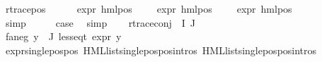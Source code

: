 \begin{isabellebody}
\ {\isacharparenleft}{\kern0pt}r{\isacharunderscore}{\kern0pt}trace{\isacharunderscore}{\kern0pt}pos\ {\isasymphi}\ {\isasymalpha}{\isacharparenright}{\kern0pt}\isanewline
\ \ \isamarkupfalse%
\ {\isachardoublequoteopen}expr{\isacharunderscore}{\kern0pt}{}\ {\isacharparenleft}{\kern0pt}hml{\isacharunderscore}{\kern0pt}pos\ {\isasymalpha}\ {\isasymphi}{\isacharparenright}{\kern0pt}\ {\isasymle}\ {}{\isachardoublequoteclose}\ {\isachardoublequoteopen}expr{\isacharunderscore}{\kern0pt}{}\ {\isacharparenleft}{\kern0pt}hml{\isacharunderscore}{\kern0pt}pos\ {\isasymalpha}\ {\isasymphi}{\isacharparenright}{\kern0pt}\ {\isasymle}\ {}{\isachardoublequoteclose}\ {\isachardoublequoteopen}expr{\isacharunderscore}{\kern0pt}{}\ {\isacharparenleft}{\kern0pt}hml{\isacharunderscore}{\kern0pt}pos\ {\isasymalpha}\ {\isasymphi}{\isacharparenright}{\kern0pt}\ {\isasymle}\ {}{\isachardoublequoteclose}\isanewline
\ \ \ \ \isamarkupfalse%
\ simp{\isacharplus}{\kern0pt}\isanewline
\ \ \isamarkupfalse%
\ \isamarkupfalse%
\ {\isacharquery}{\kern0pt}case\ \isamarkupfalse%
\ simp\isanewline
{}\isamarkupfalse%
\isanewline
\ \ \isamarkupfalse%
\ {\isacharparenleft}{\kern0pt}r{\isacharunderscore}{\kern0pt}trace{\isacharunderscore}{\kern0pt}conj\ {\isasymPhi}\ I\ J{\isacharparenright}{\kern0pt}\isanewline
\ \ \isamarkupfalse%
\ fa{\isacharunderscore}{\kern0pt}neg{\isacharcolon}{\kern0pt}\ {\isachardoublequoteopen}{\isasymforall}y{\isasymin}{\isasymPhi}\ {\isacharbackquote}{\kern0pt}\ J{\isachardot}{\kern0pt}\ less{\isacharunderscore}{\kern0pt}eq{\isacharunderscore}{\kern0pt}t\ {\isacharparenleft}{\kern0pt}expr\ y{\isacharparenright}{\kern0pt}\ {\isacharparenleft}{\kern0pt}{}{\isacharcomma}{\kern0pt}\ {\isasyminfinity}{\isacharcomma}{\kern0pt}\ {}{\isacharcomma}{\kern0pt}\ {}{\isacharcomma}{\kern0pt}\ {}{\isacharcomma}{\kern0pt}\ {}{\isacharparenright}{\kern0pt}{\isachardoublequoteclose}\isanewline
\ \ \ \ \isamarkupfalse%
\ expr{\isacharunderscore}{\kern0pt}single{\isacharunderscore}{\kern0pt}pos{\isacharunderscore}{\kern0pt}pos\ HML{\isacharunderscore}{\kern0pt}list{\isachardot}{\kern0pt}single{\isacharunderscore}{\kern0pt}pos{\isacharunderscore}{\kern0pt}pos{\isachardot}{\kern0pt}intros{\isacharparenleft}{\kern0pt}{}{\isacharparenright}{\kern0pt}\ HML{\isacharunderscore}{\kern0pt}list{\isachardot}{\kern0pt}single{\isacharunderscore}{\kern0pt}pos{\isacharunderscore}{\kern0pt}pos{\isachardot}{\kern0pt}intros{\isacharparenleft}{\kern0pt}{}{\isacharparenright}{\kern0pt}\isanewline

\end{isabellebody}
